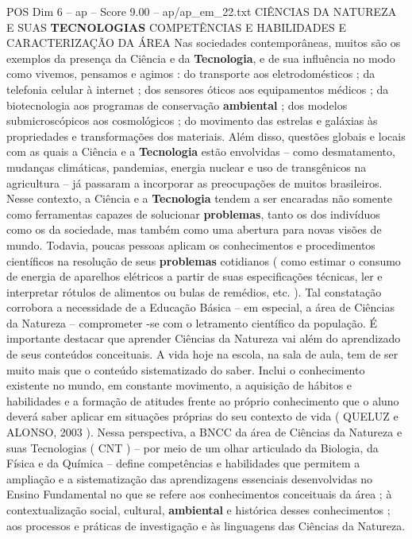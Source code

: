 \begin{textsample}{POS Dim 6 – ap – Score 9.00 – ap/ap\_em\_22.txt}  \label{ex:f6_pos_107}
CIÊNCIAS DA NATUREZA E SUAS \textbf{TECNOLOGIAS} COMPETÊNCIAS E HABILIDADES E CARACTERIZAÇÃO DA ÁREA Nas sociedades contemporâneas, muitos são os exemplos da presença da Ciência e da \textbf{Tecnologia}, e de sua influência no modo como vivemos, pensamos e agimos : do transporte aos eletrodomésticos ; da telefonia celular à internet ; dos sensores óticos aos equipamentos médicos ; da biotecnologia aos programas de conservação \textbf{ambiental} ; dos modelos submicroscópicos aos cosmológicos ; do movimento das estrelas e galáxias às propriedades e transformações dos materiais.
Além disso, questões globais e locais com as quais a Ciência e a \textbf{Tecnologia} estão envolvidas – como desmatamento, mudanças climáticas, pandemias, energia nuclear e uso de transgênicos na agricultura – já passaram a incorporar as preocupações de muitos brasileiros.
Nesse contexto, a Ciência e a \textbf{Tecnologia} tendem a ser encaradas não somente como ferramentas capazes de solucionar \textbf{problemas}, tanto os dos indivíduos como os da sociedade, mas também como uma abertura para novas visões de mundo.
Todavia, poucas pessoas aplicam os conhecimentos e procedimentos científicos na resolução de seus \textbf{problemas} cotidianos ( como estimar o consumo de energia de aparelhos elétricos a partir de suas especificações técnicas, ler e interpretar rótulos de alimentos ou bulas de remédios, etc. ).
Tal constatação corrobora a necessidade de a Educação Básica – em especial, a área de Ciências da Natureza – comprometer -se com o letramento científico da população.
É importante destacar que aprender Ciências da Natureza vai além do aprendizado de seus conteúdos conceituais.
A vida hoje na escola, na sala de aula, tem de ser muito mais que o conteúdo sistematizado do saber.
Inclui o conhecimento existente no mundo, em constante movimento, a aquisição de hábitos e habilidades e a formação de atitudes frente ao próprio conhecimento que o aluno deverá saber aplicar em situações próprias do seu contexto de vida ( QUELUZ e ALONSO, 2003 ).
Nessa perspectiva, a BNCC da área de Ciências da Natureza e suas Tecnologias ( CNT ) – por meio de um olhar articulado da Biologia, da Física e da Química – define competências e habilidades que permitem a ampliação e a sistematização das aprendizagens essenciais desenvolvidas no Ensino Fundamental no que se refere aos conhecimentos conceituais da área ; à contextualização social, cultural, \textbf{ambiental} e histórica desses conhecimentos ; aos processos e práticas de investigação e às linguagens das Ciências da Natureza.

\end{textsample}
